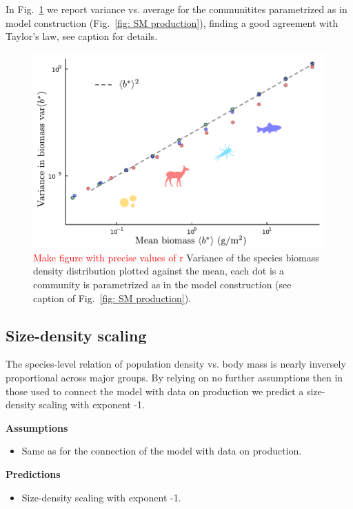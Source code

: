 \documentclass[10pt]{article}
\begin{document}
In Fig.~\ref{fig: SM Taylor's law realistic} we report variance vs.
average for the communitites parametrized as in model construction (Fig.~\ref{fig: SM production}),
finding a good agreement with Taylor's law, see caption for details.

\begin{figure}[h!]
    \centering
    \includegraphics[width=.8\textwidth]{fig/SM-taylor-realistic.pdf}
    \caption{\textcolor{red}{Make figure with precise values of r} Variance of the species biomass density distribution plotted against the mean,
    each dot is a community is parametrized as in the model construction (see
    caption of Fig.~\ref{fig: SM production}).}
    \label{fig: SM Taylor's law realistic}
\end{figure}

\subsection{Size-density scaling}
The species-level relation of population density vs. body mass
is nearly inversely proportional across major groups.
By relying on no further assumptions then in those used
to connect the model with data on production we predict
a size-density scaling with exponent -1.

\textbf{Assumptions}
\begin{itemize}
    \item Same as for the connection of the model with data on production.
\end{itemize}

\textbf{Predictions}
\begin{itemize}
    \item Size-density scaling with exponent -1.
\end{itemize}
\end{document}
